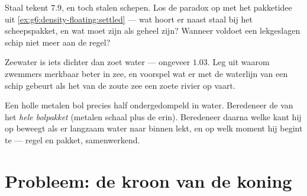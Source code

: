 \begin{exercise}[$\star\star$]\label{exo:g6:density-floating:10}
Staal tekent $7.9$, en toch  stalen schepen. Los de paradox
op met het pakketidee uit \cref{ex:g6:density-floating:settled} ---
wat hoort er naast staal bij het scheepspakket, en wat moet zijn
 als geheel zijn? Wanneer voldoet een lekgeslagen schip
niet meer aan de regel?
\end{exercise}

\begin{exercise}[$\star\star$]\label{exo:g6:density-floating:11}
Zeewater is iets dichter dan zoet water --- ongeveer $1.03$. Leg uit
waarom zwemmers merkbaar beter  in zee, en voorspel wat er met
de waterlijn van een schip gebeurt als het van de zoute zee een zoete
rivier op vaart.
\end{exercise}

\begin{exercise}[$\star\star\star$]\label{exo:g6:density-floating:12}
Een holle metalen bol  precies half ondergedompeld in water.
Beredeneer de  van het \emph{hele bolpakket} (metalen schaal
plus de  erin). Beredeneer daarna welke kant hij op beweegt als er
langzaam water naar binnen lekt, en op welk moment hij begint te
 --- regel en pakket, samenwerkend.
\end{exercise}

\section{Probleem: de kroon van de koning}

